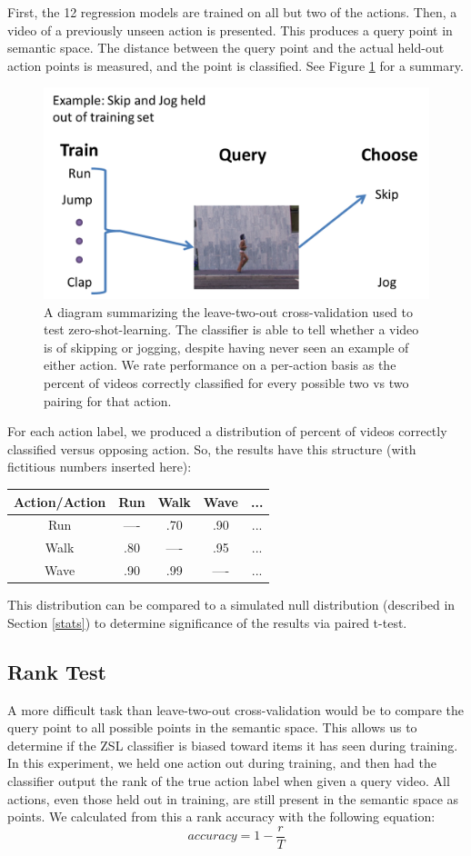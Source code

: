 \documentclass{article}
\begin{document}
First, the 12 regression models are trained on all but two of the actions. Then, a video of a previously unseen action is presented. This produces a query point in semantic space. The distance between the query point and the actual held-out action points is measured, and the point is classified. See Figure \ref{ltocv} for a summary.

\begin{figure}[h]
  \centering
  \includegraphics[width = .4\linewidth]{ltocv}
  \caption{A diagram summarizing the leave-two-out cross-validation used to test zero-shot-learning. The classifier is able to tell whether a video is of skipping or jogging, despite having never seen an example of either action. We rate performance on a per-action basis as the percent of videos correctly classified for every possible two vs two pairing for that action.}
  \label{ltocv}
\end{figure}

For each action label, we produced a distribution of percent of videos
correctly classified versus opposing action. So, the results have this
structure (with fictitious numbers inserted here):

\begin{table}[h]
\centering
\begin{tabular}{c|c|c|c|c}
Action/Action & Run & Walk & Wave & ... \\ \hline
Run & ---- & .70 & .90 & ... \\ \hline
Walk & .80 & ---- & .95 & ... \\ \hline
Wave & .90 & .99 & ---- & ... \\
\end{tabular}
\end{table}

This distribution can be compared to a simulated null distribution (described in Section \ref{stats}) to determine significance of the results via paired t-test.

\subsection{Rank Test}
A more difficult task than leave-two-out cross-validation would be to compare the query point to all possible points in the semantic space. This allows us to determine if the ZSL classifier is biased toward items it has seen during training. In this experiment, we held one action out during training, and then had the classifier output the rank of the true action label when given a query video. All actions, even those held out in training, are still present in the semantic space as points. We calculated from this a rank accuracy with the following equation:
\begin{equation}
accuracy = 1 - \frac{r}{T}
\end{equation}
\end{document}
